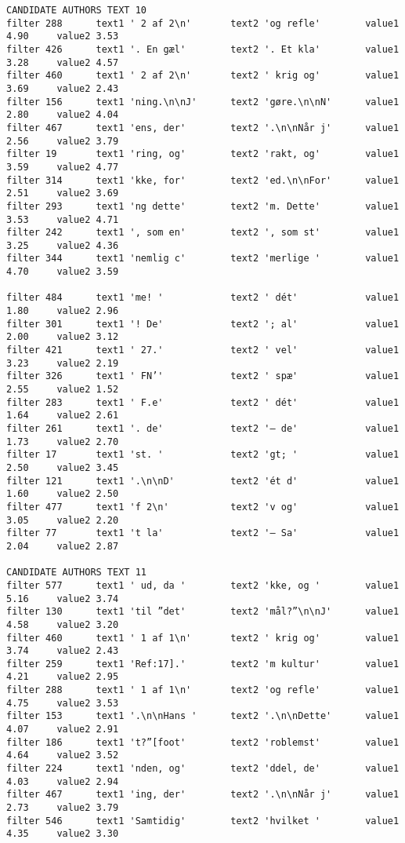 {\begin{verbatim}
CANDIDATE AUTHORS TEXT 10
filter 288      text1 ' 2 af 2\n'       text2 'og refle'        value1 4.90     value2 3.53
filter 426      text1 '. En gæl'        text2 '. Et kla'        value1 3.28     value2 4.57
filter 460      text1 ' 2 af 2\n'       text2 ' krig og'        value1 3.69     value2 2.43
filter 156      text1 'ning.\n\nJ'      text2 'gøre.\n\nN'      value1 2.80     value2 4.04
filter 467      text1 'ens, der'        text2 '.\n\nNår j'      value1 2.56     value2 3.79
filter 19       text1 'ring, og'        text2 'rakt, og'        value1 3.59     value2 4.77
filter 314      text1 'kke, for'        text2 'ed.\n\nFor'      value1 2.51     value2 3.69
filter 293      text1 'ng dette'        text2 'm. Dette'        value1 3.53     value2 4.71
filter 242      text1 ', som en'        text2 ', som st'        value1 3.25     value2 4.36
filter 344      text1 'nemlig c'        text2 'merlige '        value1 4.70     value2 3.59

filter 484      text1 'me! '            text2 ' dét'            value1 1.80     value2 2.96
filter 301      text1 '! De'            text2 '; al'            value1 2.00     value2 3.12
filter 421      text1 ' 27.'            text2 ' vel'            value1 3.23     value2 2.19
filter 326      text1 ' FN’'            text2 ' spæ'            value1 2.55     value2 1.52
filter 283      text1 ' F.e'            text2 ' dét'            value1 1.64     value2 2.61
filter 261      text1 '. de'            text2 '– de'            value1 1.73     value2 2.70
filter 17       text1 'st. '            text2 'gt; '            value1 2.50     value2 3.45
filter 121      text1 '.\n\nD'          text2 'ét d'            value1 1.60     value2 2.50
filter 477      text1 'f 2\n'           text2 'v og'            value1 3.05     value2 2.20
filter 77       text1 't la'            text2 '– Sa'            value1 2.04     value2 2.87

CANDIDATE AUTHORS TEXT 11
filter 577      text1 ' ud, da '        text2 'kke, og '        value1 5.16     value2 3.74
filter 130      text1 'til ”det'        text2 'mål?”\n\nJ'      value1 4.58     value2 3.20
filter 460      text1 ' 1 af 1\n'       text2 ' krig og'        value1 3.74     value2 2.43
filter 259      text1 'Ref:17].'        text2 'm kultur'        value1 4.21     value2 2.95
filter 288      text1 ' 1 af 1\n'       text2 'og refle'        value1 4.75     value2 3.53
filter 153      text1 '.\n\nHans '      text2 '.\n\nDette'      value1 4.07     value2 2.91
filter 186      text1 't?”[foot'        text2 'roblemst'        value1 4.64     value2 3.52
filter 224      text1 'nden, og'        text2 'ddel, de'        value1 4.03     value2 2.94
filter 467      text1 'ing, der'        text2 '.\n\nNår j'      value1 2.73     value2 3.79
filter 546      text1 'Samtidig'        text2 'hvilket '        value1 4.35     value2 3.30


\end{verbatim}}
